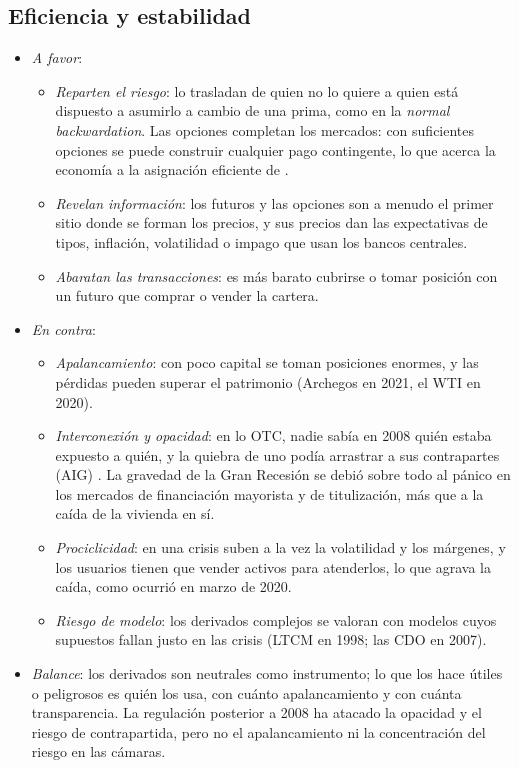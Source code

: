 \documentclass[11pt]{article}
\begin{document}
\subsection{Eficiencia y estabilidad}\label{sec:mercados-estabilidad}

\begin{itemize}
\item \emph{A favor}:
  \begin{itemize}
  \item \emph{Reparten el riesgo}: lo trasladan de quien no lo quiere a quien está dispuesto a asumirlo a cambio de una prima, como en la \emph{normal backwardation}. Las opciones completan los mercados: con suficientes opciones se puede construir cualquier pago contingente, lo que acerca la economía a la asignación eficiente de \textcite{Arrow1964Role}\nocite{Ross1976Options} .
  \item \emph{Revelan información}: los futuros y las opciones son a menudo el primer sitio donde se forman los precios, y sus precios dan las expectativas de tipos, inflación, volatilidad o impago que usan los bancos centrales.
  \item \emph{Abaratan las transacciones}: es más barato cubrirse o tomar posición con un futuro que comprar o vender la cartera.
  \end{itemize}
\item \emph{En contra}:
  \begin{itemize}
  \item \emph{Apalancamiento}: con poco capital se toman posiciones enormes, y las pérdidas pueden superar el patrimonio (Archegos en 2021, el WTI en 2020).
  \item \emph{Interconexión y opacidad}: en lo OTC, nadie sabía en 2008 quién estaba expuesto a quién, y la quiebra de uno podía arrastrar a sus contrapartes (AIG) . La gravedad de la Gran Recesión se debió sobre todo al pánico en los mercados de financiación mayorista y de titulización, más que a la caída de la vivienda en sí\nocite{Bernanke2018Real}.
  \item \emph{Prociclicidad}: en una crisis suben a la vez la volatilidad y los márgenes, y los usuarios tienen que vender activos para atenderlos, lo que agrava la caída, como ocurrió en marzo de 2020.
  \item \emph{Riesgo de modelo}: los derivados complejos se valoran con modelos cuyos supuestos fallan justo en las crisis (LTCM en 1998; las CDO en 2007).
  \end{itemize}
\item \emph{Balance}: los derivados son neutrales como instrumento; lo que los hace útiles o peligrosos es quién los usa, con cuánto apalancamiento y con cuánta transparencia. La regulación posterior a 2008 ha atacado la opacidad y el riesgo de contrapartida, pero no el apalancamiento ni la concentración del riesgo en las cámaras.
\end{itemize}
\end{document}
